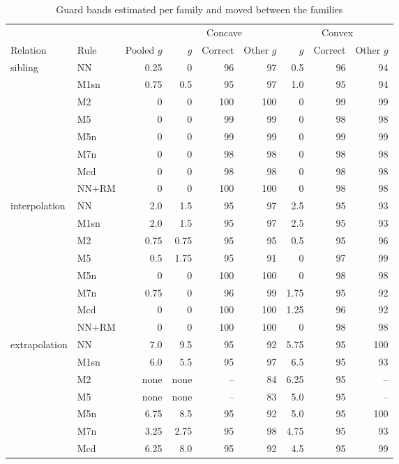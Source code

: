 \documentclass[pdflatex,sn-basic]{sn-jnl}
\newcommand{\tabsizesmall}{\footnotesize}
\begin{document}
\begin{table}[p]
\tabsizesmall
\setlength{\tabcolsep}{3pt}
\caption{Guard bands estimated per family and moved between the families}\label{tab:s-guard-family}
\begin{tabular}{@{}llrrrrrrr@{}}
\toprule
 & & & \multicolumn{3}{c}{Concave} & \multicolumn{3}{c}{Convex} \\
\cmidrule(lr){4-6}\cmidrule(lr){7-9}
Relation & Rule & Pooled $g$ & $g$ & Correct & Other $g$ & $g$ & Correct & Other $g$ \\
\midrule
sibling & NN & 0.25 & 0 & 96 & 97 & 0.5 & 96 & 94 \\
 & M1sn & 0.75 & 0.5 & 95 & 97 & 1.0 & 95 & 94 \\
 & M2 & 0 & 0 & 100 & 100 & 0 & 99 & 99 \\
 & M5 & 0 & 0 & 99 & 99 & 0 & 98 & 98 \\
 & M5n & 0 & 0 & 99 & 99 & 0 & 99 & 99 \\
 & M7n & 0 & 0 & 98 & 98 & 0 & 98 & 98 \\
 & Mcd & 0 & 0 & 98 & 98 & 0 & 98 & 98 \\
 & NN+RM & 0 & 0 & 100 & 100 & 0 & 98 & 98 \\
interpolation & NN & 2.0 & 1.5 & 95 & 97 & 2.5 & 95 & 93 \\
 & M1sn & 2.0 & 1.5 & 95 & 97 & 2.5 & 95 & 93 \\
 & M2 & 0.75 & 0.75 & 95 & 95 & 0.5 & 95 & 96 \\
 & M5 & 0.5 & 1.75 & 95 & 91 & 0 & 97 & 99 \\
 & M5n & 0 & 0 & 100 & 100 & 0 & 98 & 98 \\
 & M7n & 0.75 & 0 & 96 & 99 & 1.75 & 95 & 92 \\
 & Mcd & 0 & 0 & 100 & 100 & 1.25 & 96 & 92 \\
 & NN+RM & 0 & 0 & 100 & 100 & 0 & 98 & 98 \\
extrapolation & NN & 7.0 & 9.5 & 95 & 92 & 5.75 & 95 & 100 \\
 & M1sn & 6.0 & 5.5 & 95 & 97 & 6.5 & 95 & 93 \\
 & M2 & none & none & -- & 84 & 6.25 & 95 & -- \\
 & M5 & none & none & -- & 83 & 5.0 & 95 & -- \\
 & M5n & 6.75 & 8.5 & 95 & 92 & 5.0 & 95 & 100 \\
 & M7n & 3.25 & 2.75 & 95 & 98 & 4.75 & 95 & 93 \\
 & Mcd & 6.25 & 8.0 & 95 & 92 & 4.5 & 95 & 99 \\

\end{tabular}
\end{table}
\end{document}
